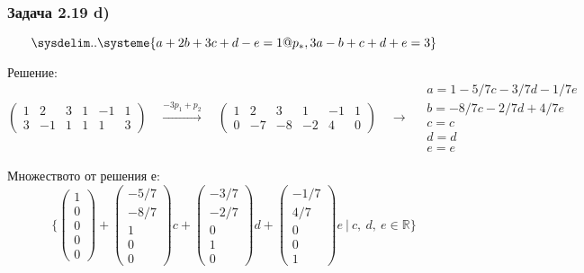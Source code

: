 \documentclass{subfiles}
\begin{document}
\subsubsection{Задача 2.19 d)}

\begin{equation*}
    \sysdelim..\systeme{
        a + 2b + 3c + d - e = 1@p_{*},
        3a - b+ c + d + e = 3
    }
\end{equation*}

\noindent Решение:
\begin{equation*}
    \left(
        \begin{array}{ ccccc|c }
            1 & 2  & 3 & 1 & -1 & 1 \\
            3 & -1 & 1 & 1 & 1  & 3
        \end{array}
    \right)
    \quad
    \overset{-3p_{1}+p_{2}}{\longrightarrow}
    \quad
    \left(
        \begin{array}{ ccccc|c }
            1 & 2  & 3  & 1  & -1 & 1 \\
            0 & -7 & -8 & -2 & 4  & 0
        \end{array}
    \right)
    \quad
    \longrightarrow
    \quad
    \begin{array}{ c }
        a = 1 - 5/7c - 3/7d - 1/7e \\
        b = -8/7c - 2/7d + 4/7e \\
        c = c \\
        d = d \\
        e = e
    \end{array}
\end{equation*}


\noindent Множеството от решения е:
\begin{equation*}
    \{
        \left(\begin{array}{ c } 1 \\ 0 \\ 0 \\ 0 \\ 0 \end{array}\right) +
        \left(\begin{array}{ c } -5/7 \\ -8/7 \\ 1 \\ 0 \\ 0 \end{array}\right) c +
        \left(\begin{array}{ c } -3/7 \\ -2/7 \\ 0 \\ 1 \\ 0 \end{array}\right) d +
        \left(\begin{array}{ c } -1/7 \\ 4/7 \\ 0 \\ 0 \\ 1 \end{array}\right) e
        \ |\ c,\ d,\ e \in \mathbb{R}
    \}
\end{equation*}
\end{document}
